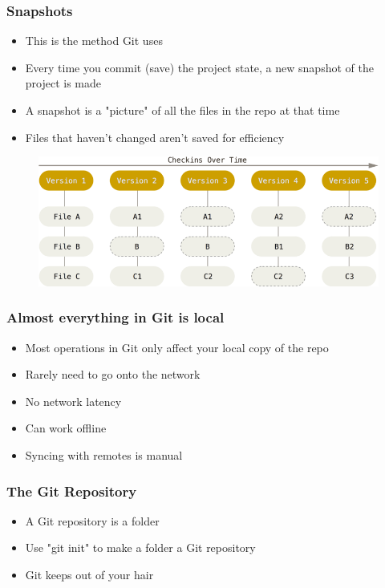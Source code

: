 \documentclass{beamer}
\begin{document}
\begin{frame}
	\frametitle{Snapshots}
	\begin{itemize}
		\item{This is the method Git uses}
		\item{Every time you commit (save) the project state, a new snapshot of the project is made}
		\item{A snapshot is a "picture" of all the files in the repo at that time}
		\item{Files that haven't changed aren't saved for efficiency}
	\end{itemize}
	\begin{figure}
		\includegraphics[scale=0.3]{Snapshots-0.png}
	\end{figure}

\end{frame}

\begin{frame}
	\frametitle{Almost everything in Git is local}
	\begin{itemize}
		\item{Most operations in Git only affect your local copy of the repo}
		\item{Rarely need to go onto the network}
		\item{No network latency}
		\item{Can work offline}
		\item{Syncing with remotes is manual}
	\end{itemize}

\end{frame}


\begin{frame}
	\frametitle{The Git Repository}
	\begin{itemize}
		\item{A Git repository is a folder}
		\item{Use "git init" to make a folder a Git repository}
		\item{Git keeps out of your hair}
	\end{itemize}
\end{frame}
\end{document}
